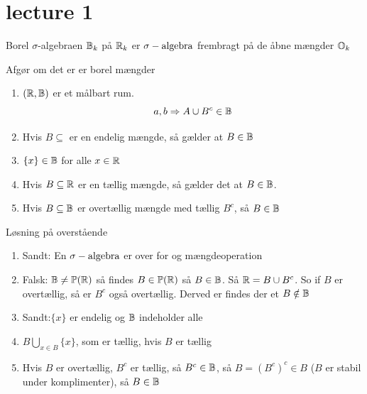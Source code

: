 \section{lecture 1} %
\label{sec:lecture_1}
\begin{defn}
Borel \(\sigma\)-algebraen \({\mathbb{B}}_k\) på \({\mathbb{R}}_k\) er \(\sigma-\text{algebra}\) frembragt på de åbne mængder \({\mathbb{O}}_k\)
\end{defn}
\begin{exercise}
Afgør om det er er borel mængder
\begin{enumerate}[label=(\arabic*)]
  \item \(({\mathbb{R}},{\mathbb{B}})\) er et målbart rum.
\[
  a,b \Rightarrow A\cup B^c\in{\mathbb{B}}
\]
\item Hvis \(B\subseteq\) er en endelig mængde, så gælder at \(B\in{\mathbb{B}}\)
\item \(\{x\}\in{\mathbb{B}}\) for alle \(x\in{\mathbb{R}}\)
\item Hvis \(B\subseteq{\mathbb{R}}\) er en tællig mængde, så gælder det at \(B\in{\mathbb{B}}\).
\item Hvis \(B\subseteq{\mathbb{B}}\) er overtællig mængde med tællig \(B^c\), så \(B\in{\mathbb{B}}\)
\end{enumerate}
\end{exercise}
\begin{solution}
Løsning på overstående
\begin{enumerate}[label=(\arabic*)]
  \item Sandt: En \(\sigma-\text{algebra}\) er  over for   og   mængdeoperation
  \item Falsk: \({\mathbb{B}}\ne{\mathbb{P}}({\mathbb{R}})\) så findes \(B\in {\mathbb{P}}({\mathbb{R}})\) så \(B\in{\mathbb{B}}\). Så \({\mathbb{R}}=B\cup B^c\). So if \(B\) er overtællig, så er \(B^c\) også overtællig. Derved er findes der et \(B\notin{\mathbb{B}}\)
  \item Sandt:\(\{x\}\) er endelig og \({\mathbb{B}}\) indeholder alle 
  \item \(B\bigcup_{x\in B}\{x\}\), som er tællig, hvis \(B\) er tællig
  \item Hvis \(B\) er overtællig, \(B^c\) er tællig, så \(B^c\in{\mathbb{B}}\), så \(B=(B^c)^c\in B\) (\(B\) er stabil under komplimenter), så \(B\in{\mathbb{B}}\)
\end{enumerate}
\end{solution}

